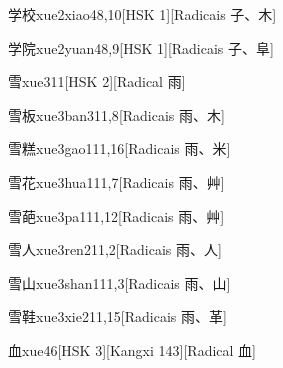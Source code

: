 \begin{entry}{学校}{xue2xiao4}{8,10}[HSK 1][Radicais ⼦、⽊]
\end{entry}

\begin{entry}{学院}{xue2yuan4}{8,9}[HSK 1][Radicais ⼦、⾩]
\end{entry}

\begin{entry}{雪}{xue3}{11}[HSK 2][Radical ⾬]
\end{entry}

\begin{entry}{雪板}{xue3ban3}{11,8}[Radicais ⾬、⽊]
\end{entry}

\begin{entry}{雪糕}{xue3gao1}{11,16}[Radicais ⾬、⽶]
\end{entry}

\begin{entry}{雪花}{xue3hua1}{11,7}[Radicais ⾬、⾋]
\end{entry}

\begin{entry}{雪葩}{xue3pa1}{11,12}[Radicais ⾬、⾋]
\end{entry}

\begin{entry}{雪人}{xue3ren2}{11,2}[Radicais ⾬、⼈]
\end{entry}

\begin{entry}{雪山}{xue3shan1}{11,3}[Radicais ⾬、⼭]
\end{entry}

\begin{entry}{雪鞋}{xue3xie2}{11,15}[Radicais ⾬、⾰]
\end{entry}

\begin{entry}{血}{xue4}{6}[HSK 3][Kangxi 143][Radical ⾎]
\end{entry}

